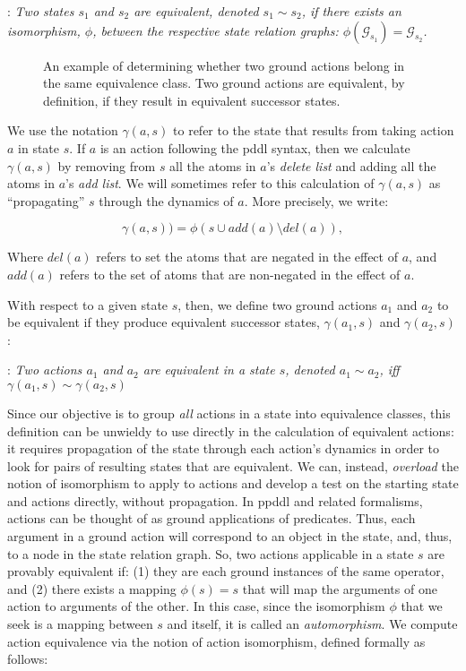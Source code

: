 :\emph{
Two \emph{states} $s_1$ and $s_2$ are {\em equivalent}, denoted
  $s_1 \sim s_2$, if there exists
 an isomorphism, 
 $\phi$, between the respective state relation graphs:
 $\phi(\mathcal{G}_{s_1})=\mathcal{G}_{s_2}$.
}
\begin{figure*}
  \centerline{}
  \caption{An example of determining whether two ground actions belong in the same equivalence class. Two ground actions are equivalent, by definition, if they result in equivalent successor states.}
  \label{actioneg}
  \end{figure*}







We use the notation $\gamma(a,s)$ to refer to the state that results from taking action $a$ in state $s$.
If $a$ is an action following the {\sc pddl} syntax, then we calculate $\gamma(a,s)$ by removing from $s$ all the atoms in $a$'s \emph{delete list} and adding all the atoms in $a$'s \emph{add list}.
We will sometimes refer to this calculation of $\gamma(a,s)$ as ``propagating'' $s$ through the dynamics of $a$. 
More precisely, we write: 

 \[ \gamma(a, s))  =  \phi( s \cup add(a) \setminus del(a)), \]

Where $del(a)$ refers to set the atoms that are negated in the effect of $a$, and $add(a)$ refers to the set of atoms that are non-negated in the effect of $a$.

With respect to a given state $s$, then, we define two ground actions  $a_1$ and
  $a_2$ to be
equivalent if they produce equivalent successor states,  $\gamma(a_1,s)$ and $\gamma(a_2,s)$:
 
:\emph{ Two \emph{actions} $a_1$ and
  $a_2$ are {\em equivalent} in a state $s$, denoted $a_1 \sim a_2$,
  iff $\gamma(a_1,s) \sim \gamma(a_2,s)$ }

Since our objective is to group \emph{all} actions in a state into equivalence classes,
 this
definition can be unwieldy to use directly in the calculation of equivalent actions: it requires propagation
of the state through each action's dynamics in order to look for pairs of resulting states that are equivalent.  We can, instead, {\em overload} the notion
of isomorphism to apply to actions and develop a test on the starting state and
actions directly, without propagation.  In {\sc ppddl} and related
formalisms, actions can be thought of as ground applications of
predicates.  Thus, each argument in a ground action will correspond
to an object in the state, and, thus, to a node in the state
relation graph. So, two actions applicable in a state $s$
are provably equivalent if: (1)
they are each ground instances of the same operator, and (2) there exists
a mapping $\phi(s) = s$ 
that will map the arguments of one action to
arguments of the other. In this case, since the isomorphism $\phi$
that we seek is
a mapping between $s$ and itself, it is called an {\em
  automorphism}. 
We compute action equivalence via the notion of action isomorphism, defined formally as follows:

